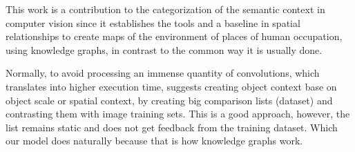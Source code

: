 
This work is a contribution to the categorization of the semantic context in computer vision since it establishes the tools and a baseline in spatial relationships to create maps of the environment of places of human occupation, using knowledge graphs, in contrast to the common way it is usually done.

Normally, to avoid processing an immense quantity of convolutions, which translates into higher execution time, \cite{Galleguillos} suggests creating object context base on object scale or spatial context, by creating big comparison lists (dataset) and contrasting them with image training sets. This is a good approach, however, the list remains static and does not get feedback from the training dataset. Which our model does naturally because that is how knowledge graphs work.